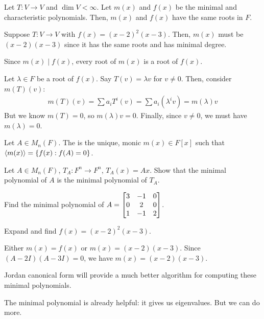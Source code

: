 \documentclass[notes,tikz]{agony}
\begin{document}
\begin{prop}
  Let $T : V \to V$ and $\dim V < \infty$.
  Let $m(x)$ and $f(x)$ be the minimal and characteristic polynomials.
  Then, $m(x)$ and $f(x)$ have the same roots in $F$.
\end{prop}
\begin{example}
  Suppose $T : V \to V$ with $f(x) = (x-2)^2(x-3)$.
  Then, $m(x)$ must be $(x-2)(x-3)$ since it has the same roots and has minimal degree.
\end{example}
\begin{prf}
  Since $m(x) \mid f(x)$, every root of $m(x)$ is a root of $f(x)$.

  Let $\lambda \in F$ be a root of $f(x)$.
  Say $T(v) = \lambda v$ for $v \neq 0$.
  Then, consider $m(T)(v)$:
  \begin{align*}
    m(T)(v) = \sum a_i T^i(v) = \sum a_i (\lambda^i v) = m(\lambda)v
  \end{align*}
  But we know $m(T) = 0$, so $m(\lambda)v = 0$.
  Finally, since $v \neq 0$, we must have $m(\lambda) = 0$.
\end{prf}

\begin{defn}
  Let $A \in M_n(F)$. The 
  is the unique, monic $m(x) \in F[x]$ such that $\ev{m(x)} = \{f(x) : f(A) = 0\}$.
\end{defn}
\begin{xca}
  Let $A \in M_n(F)$, $T_A : F^n \to F^n$, $T_A(x) = Ax$.
  Show that the minimal polynomial of $A$ is the minimal polynomial of $T_A$.
\end{xca}

\begin{example}
  Find the minimal polynomial of $A = \mqty[3&-1&0\\0&2&0\\1&-1&2]$.
\end{example}
\begin{sol}
  Expand and find $f(x) = (x-2)^2(x-3)$.

  Either $m(x) = f(x)$ or $m(x) = (x-2)(x-3)$.
  Since $(A-2I)(A-3I)=0$, we have $m(x) = (x-2)(x-3)$.
\end{sol}

\begin{remark}
  Jordan canonical form will provide a much better algorithm for computing
  these minimal polynomials.
\end{remark}

The minimal polynomial is already helpful: it gives us eigenvalues.
But we can do more.
\end{document}
